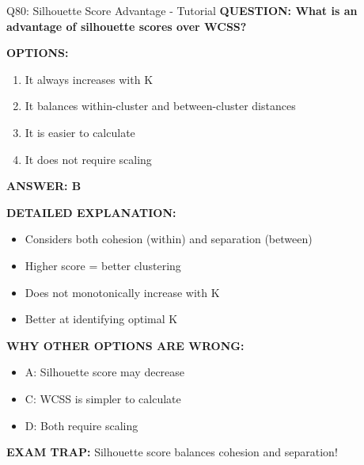 \documentclass[8pt]{beamer}
\begin{document}
	\begin{frame}{Q80: Silhouette Score Advantage - Tutorial}
		\fontsize{6.5}{7.5}\selectfont
		\textbf{QUESTION: What is an advantage of silhouette scores over WCSS?}
		
		\vspace{0.1cm}
		\textbf{OPTIONS:}
		\begin{enumerate}
			\item It always increases with K
			\item It balances within-cluster and between-cluster distances
			\item It is easier to calculate
			\item It does not require scaling
		\end{enumerate}
		
		\vspace{0.1cm}
		\textcolor{myblue}{\textbf{ANSWER: B}}
		
		\vspace{0.1cm}
		\textbf{DETAILED EXPLANATION:}
		\begin{itemize}
			\item Considers both cohesion (within) and separation (between)
			\item Higher score = better clustering
			\item Does not monotonically increase with K
			\item Better at identifying optimal K
		\end{itemize}
		
		\vspace{0.1cm}
		\textcolor{myred}{\textbf{WHY OTHER OPTIONS ARE WRONG:}}
		\begin{itemize}
			\item \textcolor{myred}{A:} Silhouette score may decrease
			\item \textcolor{myred}{C:} WCSS is simpler to calculate
			\item \textcolor{myred}{D:} Both require scaling
		\end{itemize}
		
		\textcolor{myred}{\textbf{EXAM TRAP:}} Silhouette score balances \textcolor{myblue}{cohesion and separation}!
	\end{frame}
	
\end{document}
